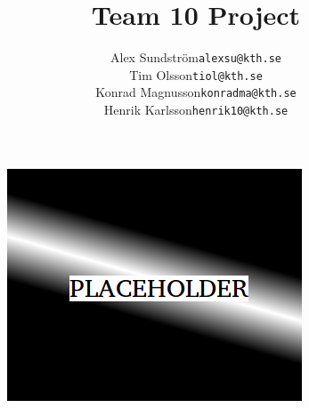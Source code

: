 \documentclass{article}
\title{Team 10 Project}
\author{
	\begin{tabular}{rl}
		Alex Sundström&   \texttt{alexsu@kth.se}\\
		Tim Olsson&       \texttt{tiol@kth.se}\\
		Konrad Magnusson& \texttt{konradma@kth.se}\\
		Henrik Karlsson&  \texttt{henrik10@kth.se}
	\end{tabular}
	}
\begin{document}
	\maketitle
	
	\begin{figure}[h]
		\centering
		\vspace*{2cm}
		\includegraphics[scale=0.7]{img/front}
	\end{figure}
	
	
\end{document}
